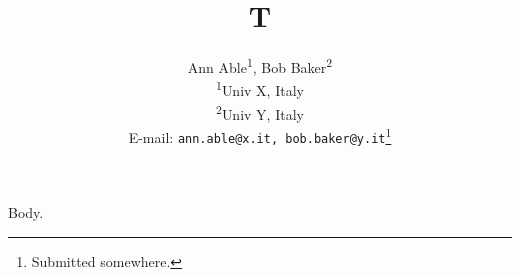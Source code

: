 \documentclass{article}
\begin{document}
\title{T}
\author{
Ann Able\textsuperscript{1}, Bob Baker\textsuperscript{2} \\
\textsuperscript{1}Univ X, Italy \\
\textsuperscript{2}Univ Y, Italy \\
E-mail: \texttt{ann.able@x.it, bob.baker@y.it}\thanks{Submitted somewhere.}
}
\maketitle
Body.
\end{document}

